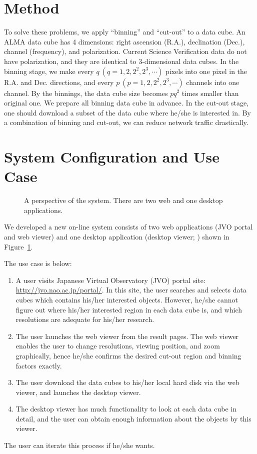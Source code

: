 \documentclass[11pt,twoside]{article}
\begin{document}
\section{Method}

To solve these problems, we apply ``binning'' and ``cut-out'' to a data cube.
An ALMA data cube has 4 dimensions: right ascension (R.A.), declination (Dec.), channel
(frequency), and polarization.
Current Science Verification data do not have polarization, and they are
identical to 3-dimensional data cubes.
In the binning stage, we make every $q \ (q = 1, 2, 2^{2}, 2^{3}, \cdots)$ pixels into one pixel
in the R.A. and Dec. directions, and every $p \ (p = 1, 2, 2^{2}, 2^{3}, \cdots)$ channels into
one channel.
By the binnings, the data cube size becomes $p q^{2}$ times smaller than original one.
We prepare all binning data cube in advance.
In the cut-out stage, one should download a subset of the data cube where he/she is
interested in.
By a combination of binning and cut-out, we can reduce network traffic drastically.

\section{System Configuration and Use Case}

\begin{figure}
	\caption{A perspective of the system. There are two web and one desktop applications.
	\label{O10_f1}}
\end{figure}

We developed a new on-line system \citep{D5_adassxxii} consists of two web applications
(JVO portal and web viewer) and one desktop application
(desktop viewer; \citealt{P047_adassxxii}) shown in Figure~\ref{O10_f1}.

The use case is below:
\begin{enumerate}
	\item A user visits Japanese Virtual Observatory (JVO) portal site:
	\url{http://jvo.nao.ac.jp/portal/}.
	In this site, the user searches and selects data cubes which
	contains his/her interested objects.
	However, he/she cannot figure out where his/her interested region
	in each data cube is, and which resolutions are adequate for his/her
	research.
	
	\item The user launches the web viewer from the result pages.
	The web viewer enables the user to change resolutions, viewing position, and
	zoom graphically, hence he/she confirms the desired cut-out region and binning
	factors exactly.
	
	\item The user download the data cubes to his/her local hard disk via the
	web viewer, and launches the desktop viewer.
	
	\item The desktop viewer has much functionality to look at each data cube in detail,
	and the user can obtain enough information about the objects by this viewer.
\end{enumerate}
The user can iterate this process if he/she wants.
\end{document}

